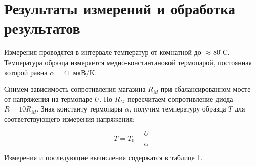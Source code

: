 \documentclass[a4paper, 12pt]{article}
\begin{document}
\section{Результаты измерений и обработка результатов}

	Измерения проводятся в интервале температур от комнатной до
        $\approx 80^\circ$C. Температура образца измеряется медно-константановой термопарой, постоянная которой равна $\alpha = 41$ мкВ/K.


	Снимем зависимость сопротивления магазина $R_M$ при сбалансированном мосте от напряжения на термопаре $U$. По $R_M$ пересчитаем сопротивление диода $R = 10R_M$. Зная константу термопары $\alpha$,  получим температуру образца $T$ для соответствующего измерения напряжения:

        \[ T = T_0 + \frac{U}{\alpha} \]

	Измерения и последующие вычисления содержатся в таблице 1. 

\renewcommand{\arraystretch}{1.2}
\end{document}
